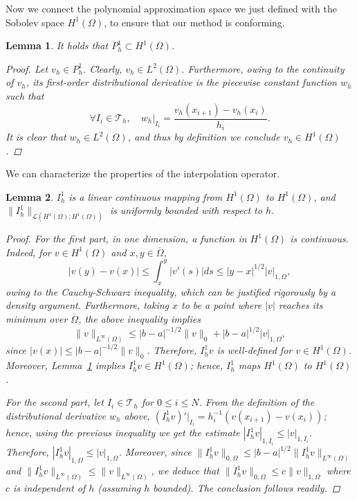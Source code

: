 \documentclass{article}
\newtheorem{lemma}{Lemma}
\begin{document}
Now we connect the polynomial approximation space we just defined with the Sobolev space $H^1(\Omega)$, to ensure that our method is conforming. 
\begin{lemma}\label{approxP1}
    It holds that $P_h^1 \subset H^1(\Omega)$.
    \begin{proof}
    Let $v_h \in P_h^1$. Clearly, $v_h \in L^2(\Omega)$. Furthermore, owing to the continuity of $v_h$, its first-order distributional derivative is the piecewise constant function $w_h$ such that
    $$\forall I_i \in \mathcal{T}_h,\quad  w_h|_{I_i} = \frac{v_h(x_{i+1}) - v_h(x_i)}{h_i}.$$
    It is clear that $w_h\in L^2(\Omega)$, and thus by definition we conclude $v_h\in H^1(\Omega)$.
    \end{proof}
\end{lemma}
We can characterize the properties of the interpolation operator. 
\begin{lemma}\label{cont1D}
    $I_h^1$ is a linear continuous mapping from $H^1(\Omega)$ to $H^1(\Omega)$, and $\|I_h^1\|_{\mathcal{L}(H^1(\Omega);H^1(\Omega))}$ is uniformly bounded with respect to $h$.
    \begin{proof}
    For the first part, in one dimension, a function in $H^1(\Omega)$ is continuous. Indeed, for $v \in H^1(\Omega)$ and $x,y \in \overline{\Omega}$,
    \begin{equation}\label{eq:interpolator_continuity_1d}
        |v(y) - v(x)| \le \int_x^y |v'(s)| ds  \le |y-x|^{1/2} |v|_{1,\Omega},
    \end{equation}
    owing to the Cauchy-Schwarz inequality, which can be justified rigorously by a density argument. Furthermore, taking $x$ to be a point where $|v|$ reaches its minimum over $\overline{\Omega}$, the above inequality implies
    \begin{equation*}\label{eq:supnorm_p1}
        \|v\|_{L^\infty(\Omega)} \le |b-a|^{-1/2} \|v\|_0 + |b-a|^{1/2}|v|_{1,\Omega},
    \end{equation*}
    since $|v(x)| \le |b-a|^{-1/2} \|v\|_{0}$. Therefore, $I_h^1 v$ is well-defined for $v \in H^1(\Omega)$. Moreover, Lemma~\ref{approxP1} implies $I_h^1 v \in H^1(\Omega)$; hence, $I_h^1$ maps $H^1(\Omega)$ to $H^1(\Omega)$.

    For the second part, let $I_i \in \mathcal{T}_h$ for $0 \le i \le N$. From the definition of the distributional derivative $w_h$ above, $(I_h^1 v)'|_{I_i} = h_i^{-1}(v(x_{i+1}) - v(x_i))$; hence, using the previous inequality we get the estimate $|I_h^1 v|_{1,I_i} \le |v|_{1,I_i}$. Therefore, $|I_h^1 v|_{1,\Omega} \le |v|_{1,\Omega}$. Moreover, since $\|I_h^1 v\|_{0,\Omega} \le |b-a|^{1/2} \|I_h^1 v\|_{L^\infty(\Omega)}$ and $\|I_h^1 v\|_{L^\infty(\Omega)} \le \|v\|_{L^\infty(\Omega)}$, we deduce that $\|I_h^1 v\|_{0,\Omega} \le c \|v\|_{1,\Omega}$ where $c$ is independent of $h$ (assuming $h$ bounded). The conclusion follows readily.
    \end{proof}
\end{lemma}
\end{document}
